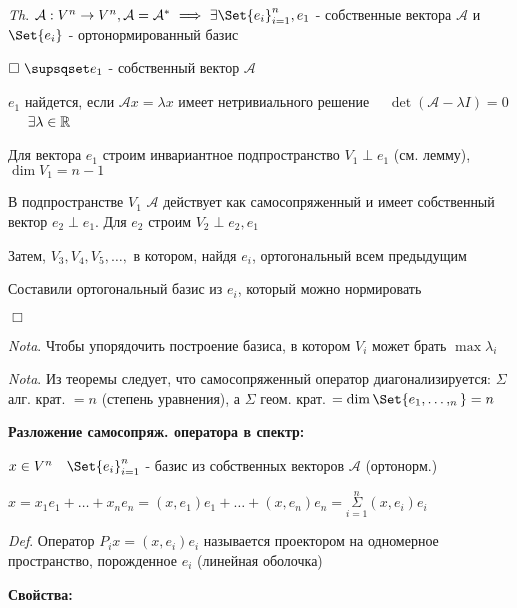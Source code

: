 \documentclass[12pt]{article}
\begin{document}
    \vspace{3mm}
\textit{Th}. $\mathcal{A}: V^n \to V^n, \mathcal{A} = \mathcal{A}^* \ \Longrightarrow \ \exists \Set{e_i}^n_{i=1}, e_1$ -
    собственные вектора $\mathcal{A}$ и $\Set{e_i}$ - ортонормированный базис

    $\Box \ \supsqset e_1$ - собственный вектор $\mathcal{A}$

    $e_1$ найдется, если $\mathcal{A}x = \lambda x$ имеет нетривиального решение \ \Longleftrightarrow \
    $\det(\mathcal{A} - \lambda I) = 0$ \  \ $\exists \lambda \in \mathbb{R}$

    Для вектора $e_1$ строим инвариантное подпространство $V_1 \perp e_1$ (см. лемму), $\dim V_1 = n - 1$

    В подпространстве $V_1$ $\mathcal{A}$ действует как самосопряженный и имеет собственный вектор $e_2 \perp e_1$.
    Для $e_2$ строим $V_2 \perp e_2, e_1$

    Затем, $V_3, V_4, V_5, \dots,$ в котором, найдя $e_i$, ортогональный всем предыдущим

    Составили ортогональный базис из $e_i$, который можно нормировать

    $\Box$

    \vspace{3mm}
\textit{Nota}. Чтобы упорядочить построение базиса, в котором $V_i$ может брать $\max \lambda_i$

    \vspace{3mm}
\textit{Nota}. Из теоремы следует, что самосопряженный оператор диагонализируется: $\displaystyle \Sigma$ алг. крат. $ = n$ (степень уравнения), а $\displaystyle \Sigma$ геом. крат. $= \dim \Set{e_1, \dots, _n} = n$


    \vspace{5mm}
    \textbf{
    Разложение самосопряж. оператора в спектр:}

    $x \in V^n \quad \Set{e_i}_{i=1}^n$ - базис из собственных векторов $\mathcal{A}$ (ортонорм.)

    $\displaystyle x = x_1 e_1 + \dots + x_n e_n = (x, e_1) e_1 + \dots + (x, e_n) e_n = \overset{n}{\underset{i = 1}{\Sigma}} (x, e_i) e_i$

    \vspace{3mm}
\textit{Def}. Оператор $P_i x = (x, e_i) e_i$ называется проектором на одномерное пространство, порожденное $e_i$ (линейная оболочка)

    \vspace{5mm}
    \textbf{
    Свойства:}
\end{document}
